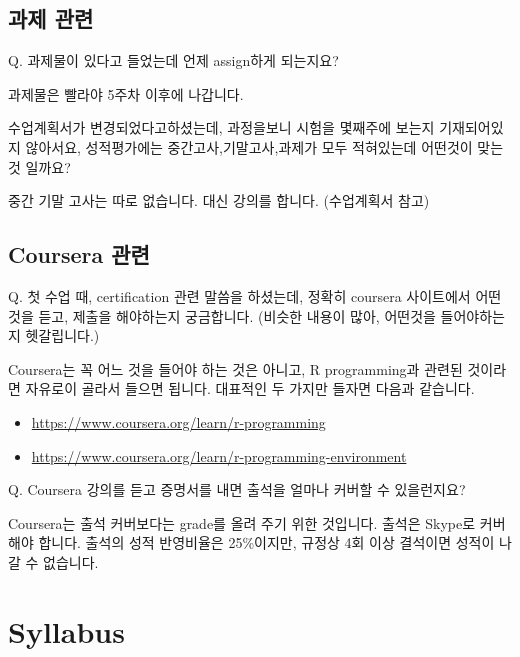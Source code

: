 \documentclass[10pt,]{krantz}
\providecommand{\tightlist}{%
  \setlength{\itemsep}{0pt}\setlength{\parskip}{0pt}}
\renewenvironment{quote}{\begin{VF}}{\end{VF}}
\begin{document}
\subsection*{과제 관련}\label{-}


\begin{quote}
Q. 과제물이 있다고 들었는데 언제 assign하게 되는지요?
\end{quote}

과제물은 빨라야 5주차 이후에 나갑니다.

\begin{quote}
수업계획서가 변경되었다고하셨는데, 과정을보니 시험을 몇째주에 보는지
기재되어있지 않아서요, 성적평가에는 중간고사,기말고사,과제가 모두
적혀있는데 어떤것이 맞는 것 일까요?
\end{quote}

중간 기말 고사는 따로 없습니다. 대신 강의를 합니다. (수업계획서 참고)

\subsection*{Coursera 관련}\label{coursera-}


\begin{quote}
Q. 첫 수업 때, certification 관련 말씀을 하셨는데, 정확히 coursera
사이트에서 어떤 것을 듣고, 제출을 해야하는지 궁금합니다. (비슷한 내용이
많아, 어떤것을 들어야하는지 헷갈립니다.) 
\end{quote}

Coursera는 꼭 어느 것을 들어야 하는 것은 아니고, R programming과 관련된
것이라면 자유로이 골라서 들으면 됩니다. 대표적인 두 가지만 들자면 다음과
같습니다.

\begin{itemize}
\tightlist
\item
  \url{https://www.coursera.org/learn/r-programming}
\item
  \url{https://www.coursera.org/learn/r-programming-environment}
\end{itemize}

\begin{quote}
Q. Coursera 강의를 듣고 증명서를 내면 출석을 얼마나 커버할 수
있을런지요?
\end{quote}

Coursera는 출석 커버보다는 grade를 올려 주기 위한 것입니다. 출석은
Skype로 커버해야 합니다. 출석의 성적 반영비율은 25\%이지만, 규정상 4회
이상 결석이면 성적이 나갈 수 없습니다.

\section*{Syllabus}\label{syllabus}
\end{document}
